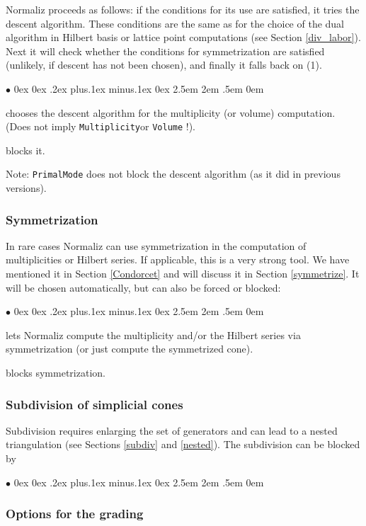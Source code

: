 \documentclass[12pt,a4paper]{scrartcl}
\newcommand{\stdli}{ \topsep0ex \partopsep0ex %
\parsep.2ex plus.1ex minus.1ex \itemsep0ex%
\leftmargin2.5em \labelwidth2em \labelsep.5em \rightmargin0em}%
\renewenvironment{itemize}{\begin{list}{{$\bullet$}}{\stdli}}{\end{list}}
\theoremstyle{definition}
\def\itemtt[#1]{\item[\textbf{\ttt{#1}}]}
\def\ttt{\texttt}
\begin{document}
Normaliz proceeds as follows: if the conditions for its use are satisfied, it tries the descent algorithm. These conditions are the same as for the choice of the dual algorithm in Hilbert basis or lattice point computations (see Section \ref{div_labor}). Next it will check whether the conditions for  symmetrization are satisfied (unlikely, if descent has not been chosen), and finally it falls back on (1).
\begin{itemize}
	\itemtt[Descent, -F] chooses the descent algorithm for the multiplicity (or volume) computation. (Does not imply \verb|Multiplicity|or \verb|Volume| !).
	
	\itemtt[NoDescent] blocks it.
\end{itemize}

Note: \verb|PrimalMode| does not block the descent algorithm (as it did in previous versions).

\subsubsection{Symmetrization}

In rare cases Normaliz can use symmetrization in the computation of multiplicities or Hilbert series. If applicable, this is a very strong tool. We have mentioned it in Section \ref{Condorcet} and will discuss it in Section \ref{symmetrize}.  It will be chosen automatically, but can also be forced or blocked:
\begin{itemize}
	\itemtt[Symmetrize, -Y] lets Normaliz compute the multiplicity and/or the Hilbert series via symmetrization (or just compute the symmetrized cone).
	
	\itemtt[NoSymmetrization] blocks symmetrization.
\end{itemize}

\subsubsection{Subdivision of simplicial cones}

Subdivision requires enlarging the set of generators and can lead to a nested triangulation (see Sections \ref{subdiv} and \ref{nested}). The subdivision can be blocked by 
\begin{itemize}
	\itemtt[NoSubdivision]
\end{itemize}

\subsubsection{Options for the grading}
\end{document}

